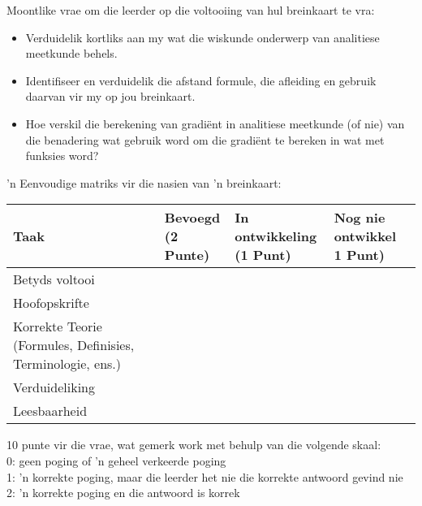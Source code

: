 Moontlike vrae om die leerder op die voltooiing van hul breinkaart te vra:
\begin{itemize}
\item
Verduidelik kortliks aan my wat die wiskunde onderwerp van analitiese
meetkunde behels.
\item
Identifiseer en verduidelik die afstand formule, die afleiding en
gebruik daarvan vir my op jou breinkaart.
\item
Hoe verskil die berekening van gradi\"{e}nt in analitiese meetkunde (of
nie) van die benadering wat gebruik word om die gradi\"{e}nt te bereken in
wat met funksies word?
\end{itemize}
'n Eenvoudige matriks vir die nasien van 'n breinkaart:
\begin{table}[H]
 \begin{center}
  \begin{tabular}{|p{3cm}|p{2.5cm}|p{2.5cm}|p{3cm}|} \hline
  \textbf{Taak} & \textbf{Bevoegd \newline(2 Punte)} & \textbf{In ontwikkeling \newline(1 Punt)}& \textbf{Nog nie ontwikkel \newline 1 Punt)}\\ \hline
Betyds voltooi &&&\\ \hline
Hoofopskrifte &&&\\ \hline
Korrekte Teorie (Formules, Definisies, Terminologie, ens.) &&&\\ \hline
Verduideliking &&&\\ \hline
Leesbaarheid&&&\\ \hline

  \end{tabular}

 \end{center}

\end{table}

10 punte vir die vrae, wat gemerk work met behulp van die volgende skaal:\\
0: geen poging of 'n geheel verkeerde poging\\
1: 'n korrekte poging, maar die leerder het nie die korrekte antwoord gevind nie\\
2: 'n korrekte poging en die antwoord is korrek

